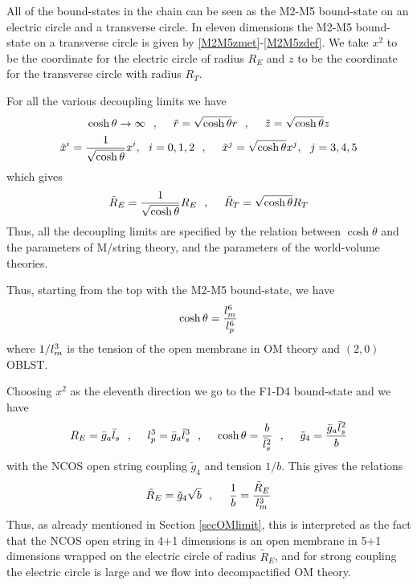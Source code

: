 \documentclass[a4paper,twoside,titlepage,12pt]{article}
\begin{document}
All of the bound-states in the chain can be seen as the M2-M5 bound-state
on an electric circle and a transverse circle. 
In eleven dimensions the M2-M5 bound-state on a transverse
circle is given by \eqref{M2M5zmet}-\eqref{M2M5zdef}.
We take \( x^2 \) to be the coordinate for the electric circle of 
radius $R_E$ and $z$ to be the coordinate for the transverse circle
with radius $R_T$.

For all the various decoupling limits we have
%
\begin{equation}
\label{Alllim1}
\cosh \theta \rightarrow \infty \ \ ,\ \ \ \ 
\tilde{r} = \sqrt{\cosh \theta} r \ \ ,\ \ \ \ 
\tilde{z} = \sqrt{\cosh \theta} z 
\end{equation}
%
\begin{equation}
\label{Alllim2}
\tilde{x}^i = \frac{1}{\sqrt{\cosh \theta}} x^i, \ \ i=0,1,2 \ \ ,\ \ \ \ 
\tilde{x}^j = \sqrt{\cosh \theta} x^j,\ \ j=3,4,5 
\end{equation}
%
which gives
%
\begin{equation}
\tilde{R}_E = \frac{1}{\sqrt{\cosh \theta}} R_E \ \ ,\ \ \ \ 
\tilde{R}_T = \sqrt{\cosh \theta} R_T 
\end{equation}
%
Thus, all the decoupling limits are specified by the relation between
\( \cosh \theta \) and the parameters of M/string theory, and
the parameters of the world-volume theories.

Thus, starting from the top with the M2-M5 bound-state, we have
%
\begin{equation}
\cosh \theta = \frac{l_m^6}{l_p^6}
\end{equation}
%
where \( 1/l_m^3 \) is the tension of the open membrane in OM theory
and $(2,0)$ OBLST.

Choosing $x^2$ as the eleventh direction
we go to the F1-D4 bound-state and we have
%
\begin{equation}
R_E = \bar{g}_a \bar{l}_s \ \ ,\ \ \ \ 
l_p^3 = \bar{g}_a \bar{l}_s^3 \ \ ,\ \ \ \ 
\cosh \theta = \frac{b}{\bar{l}_s^2} \ \ ,\ \ \ \ 
\tilde{g}_4 = \frac{\bar{g}_a \bar{l}_s^2}{b}
\end{equation}
%
with the NCOS open string coupling \( \tilde{g}_4 \) and tension $1/b$.
This gives the relations
%
\begin{equation}
\tilde{R}_E = \tilde{g}_4 \sqrt{b} \ \ ,\ \ \ \ 
\frac{1}{b} = \frac{\tilde{R}_E}{l_m^3}
\end{equation}
%
Thus, as already mentioned in Section \ref{secOMlimit}, this is interpreted
\cite{Gopakumar:2000ep,Bergshoeff:2000ai}
as the fact that the NCOS open string in 4+1 dimensions is an
 open membrane in 5+1 dimensions wrapped on the electric circle of 
radius $\tilde{R}_E$, and for strong coupling
the electric circle is large and we flow into decompactified 
OM theory.
\end{document}
